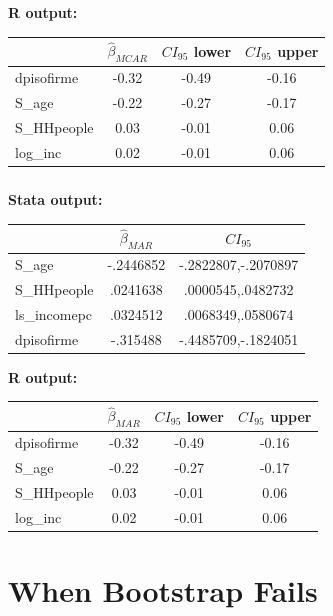 \documentclass[12pt]{article}
\begin{document}
\vspace{1cm}
\textbf{R output:}\\
\begin{tabular}{lccc}
  \hline
  & $\hat \beta_{MCAR}$  & $CI_{95}$ lower & $CI_{95}$ upper \\
  \hline
dpisofirme & -0.32  & -0.49 & -0.16  \\
  S\_age & -0.22 & -0.27 & -0.17 \\
  S\_HHpeople & 0.03  & -0.01 & 0.06 \\
  log\_inc & 0.02 &  -0.01 & 0.06 \\
   \hline
\end{tabular}


\subsubsection{}
\textbf{Stata output:}\\

\begin{tabular}{lcc}
\hline
&           $\hat \beta_{MAR}$ &     $CI_{95}$\\
\hline
S\_age       &   -.2446852&-.2822807,-.2070897\\
S\_HHpeople  &    .0241638&.0000545,.0482732\\
ls\_incomepc &    .0324512&.0068349,.0580674\\
dpisofirme  &    -.315488&-.4485709,-.1824051\\
\hline
\end{tabular}

\vspace{1cm}
\textbf{R output:}\\
\begin{tabular}{lccc}
  \hline
  & $\hat \beta_{MAR}$  & $CI_{95}$ lower & $CI_{95}$ upper \\
  \hline
  dpisofirme & -0.32  & -0.49 & -0.16 \\
    S\_age & -0.22 & -0.27 & -0.17 \\
    S\_HHpeople & 0.03  & -0.01 & 0.06 \\
    log\_inc & 0.02  & -0.01 & 0.06 \\
\hline
\end{tabular}

\newpage
\section{When Bootstrap Fails}
\end{document}
